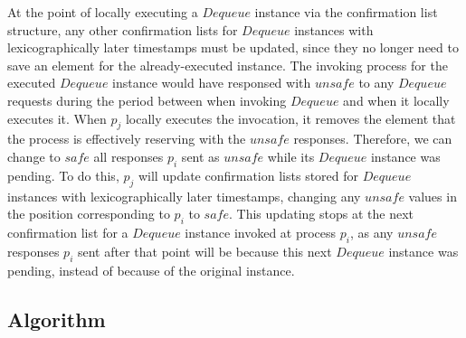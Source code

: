 \documentclass[a4paper,anonymous,USenglish]{lipics-v2021} %
\theoremstyle{definition}
\begin{document}
At the point of locally executing a $Dequeue$ instance via the confirmation list structure, any other confirmation lists for $Dequeue$ instances with lexicographically later timestamps must be updated, since they no longer need to save an element for the already-executed instance.  The invoking process for the executed $Dequeue$ instance would have responsed with $unsafe$ to any $Dequeue$ requests during the period between when invoking $Dequeue$ and when it locally executes it.  When $p_j$ locally executes the invocation, it removes the element that the process is effectively reserving with the $unsafe$ responses. Therefore, we can change to $safe$ all responses $p_i$ sent as $unsafe$ while its $Dequeue$ instance was pending.  To do this, $p_j$ will update confirmation lists stored for $Dequeue$ instances with lexicographically later timestamps, changing any $unsafe$ values in the position corresponding to $p_i$ to $safe$.  This updating stops at the next confirmation list for a $Dequeue$ instance invoked at process $p_i$, as any $unsafe$ responses $p_i$ sent after that point will be because this next $Dequeue$ instance was pending, instead of because of the original instance.

\subsection{Algorithm}

\end{document}
